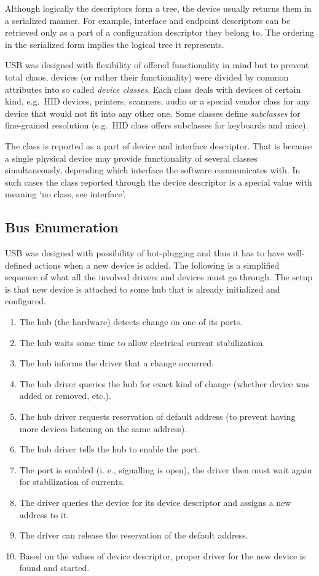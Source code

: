 Although logically the descriptors form a tree, the device usually returns them
in a serialized manner. For example, interface and endpoint descriptors can be
retrieved only as a part of a configuration descriptor they belong to. The
ordering in the serialized form implies the logical tree it represents.

USB was designed with flexibility of offered functionality in mind but to
prevent total chaos, devices (or rather their functionality) were divided by
common attributes into so called \textit{device classes}. Each class deals with
devices of certain kind, e.g.\ HID devices, printers, scanners, audio or a
special vendor class for any device that would not fit into any other one. Some
classes define \textit{subclasses} for fine-grained resolution (e.g.\ HID class
offers subclasses for keyboards and mice).

The class is reported as a part of device and interface descriptor. That is
because a single physical device may provide functionality of several classes
simultaneously, depending which interface the software communicates with. In
such cases the class reported through the device descriptor is a special value
with meaning ‘no class, see interface’.

\subsection{Bus Enumeration}

USB was designed with possibility of hot-plugging and thus it has to have
well-defined actions when a new device is added. The following is a simplified
sequence of what all the involved drivers and devices must go through. The
setup is that new device is attached to some hub that is already initialized
and configured.

\begin{enumerate}
\item The hub (the hardware) detects change on one of its ports.
\item The hub waits some time to allow electrical current stabilization.
\item The hub informs the driver that a change occurred.
\item The hub driver queries the hub for exact kind of change (whether device
was added or removed, etc.).
\item The hub driver requests reservation of default address (to prevent having
more devices listening on the same address).
\item The hub driver tells the hub to enable the port.
\item The port is enabled (i. e., signalling is open), the driver then must wait
again for stabilization of currents.
\item The driver queries the device for its device descriptor and assigns a new
address to it.
\item The driver can release the reservation of the default address.
\item Based on the values of device descriptor, proper driver for the new
device is found and started.
\end{enumerate}

